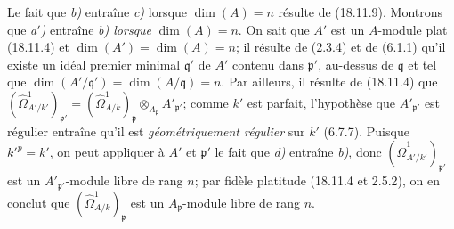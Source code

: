 Le fait que \emph{b)} entraîne \emph{c)} lorsque $\dim(A)=n$ résulte de (18.11.9). Montrons que \emph{a$'$)} entraîne \emph{b) lorsque} $\dim(A)=n$. On sait que $A'$ est un $A$-module plat (18.11.4) et $\dim(A')=\dim(A)=n$; il résulte de (2.3.4) et de (6.1.1) qu'il existe un idéal premier minimal $\mathfrak q'$ de $A'$ contenu dans $\mathfrak p'$, au-dessus de $\mathfrak q$ et tel que $\dim(A'/\mathfrak q')=\dim(A/\mathfrak q)=n$. Par ailleurs, il résulte de (18.11.4) que
$(\hat{\Omega}^1_{A'/k'})_{\mathfrak p'}=(\hat{\Omega}^1_{A/k})_{\mathfrak p}\otimes_{A_{\mathfrak p}}A'_{\mathfrak p'}$;
comme $k'$ est parfait, l'hypothèse que $A'_{\mathfrak p'}$ est régulier entraîne qu'il est \emph{géométriquement régulier} sur $k'$ (6.7.7). Puisque $k'^p=k'$, on peut appliquer à $A'$ et $\mathfrak p'$ le fait que \emph{d)} entraîne \emph{b)}, donc $(\hat{\Omega}^1_{A'/k'})_{\mathfrak p'}$ est un $A'_{\mathfrak p'}$-module libre de rang $n$; par fidèle platitude (18.11.4 et 2.5.2), on en conclut que $(\hat{\Omega}^1_{A/k})_{\mathfrak p}$ est un $A_{\mathfrak p}$-module libre de rang $n$.

